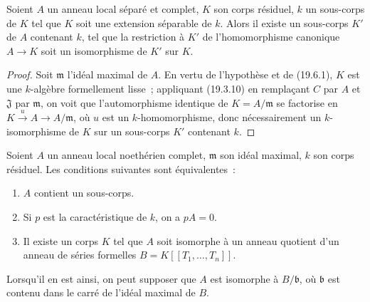 \begin{corollary}[19.6.2]
\label{0.19.6.2-fr}
Soient $A$ un anneau local séparé et complet, $K$ son corps résiduel, $k$ un
sous-corps de $K$ tel que $K$ soit une extension séparable de $k$. Alors il
existe un sous-corps $K'$ de $A$ contenant $k$, tel que la restriction à $K'$
de l'homomorphisme canonique $A\to K$ soit un isomorphisme de $K'$ sur $K$.
\end{corollary}

\begin{proof}
Soit $\mathfrak m$ l'idéal maximal de $A$. En vertu de l'hypothèse et de
(19.6.1), $K$ est une $k$-algèbre formellement lisse~; appliquant (19.3.10) en
remplaçant $C$ par $A$ et $\mathfrak J$ par $\mathfrak m$, on voit que
l'automorphisme identique de $K=A/\mathfrak m$ se factorise en
$K\xrightarrow{u}A\to A/\mathfrak m$, où $u$ est un $k$-homomorphisme, donc
nécessairement un $k$-isomorphisme de $K$ sur un sous-corps $K'$ contenant
$k$.
\end{proof}

\begin{corollary}[19.6.3]
\label{0.19.6.3-fr}
Soient $A$ un anneau local noethérien complet, $\mathfrak m$ son idéal maximal,
$k$ son corps résiduel. Les conditions suivantes sont équivalentes~:
\begin{enumerate}
  \item[a)] $A$ contient un sous-corps.
  \item[b)] Si $p$ est la caractéristique de $k$, on a $pA=0$.
  \item[c)] Il existe un corps $K$ tel que $A$ soit isomorphe à un anneau
  quotient d'un anneau de séries formelles $B=K[[T_1,\ldots,T_n]]$.
\end{enumerate}
Lorsqu'il en est ainsi, on peut supposer que $A$ est isomorphe à $B/\mathfrak b$,
où $\mathfrak b$ est contenu dans le carré de l'idéal maximal de $B$.
\end{corollary}

